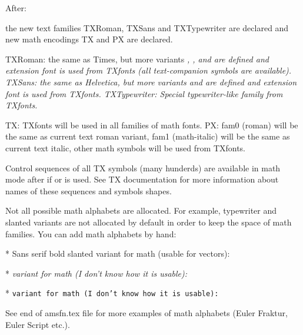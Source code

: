 After:



the new text families TXRoman, TXSans and TXTypewriter
are declared and new math encodings TX and PX are declared.

TXRoman: the same as Times, but more variants \sl, \bsl, \csc and 
         \bcsc are defined and extension font is used from TXfonts 
         (all text-companion symbols are available).
TXSans:  the same as Helvetica, but more variants \csc and \bcsc
         are defined and extension font is used from TXfonts.
TXTypewriter: Special typewriter-like family from TXfonts.

TX: TXfonts will be used in all families of math fonts.
PX: fam0 (roman) will be the same as current text roman variant,
    fam1 (math-italic) will be the same as current text italic,
    other math symbols will be used from TXfonts.

Control sequences of all TX symbols (many hunderds) are available 
in math mode after \setmath[//] if \def\fomenc{TX} or
\def\fomenc{PX} is used. See TX documentation for more information
about names of these sequences and symbols shapes.

Not all possible math alphabets are allocated. For example, typewriter
and slanted variants are not allocated by default in order to keep the
space of math families. You can add math alphabets by hand:

* Sans serif bold slanted variant for math (usable for vectors):

\addcmd\mathfonts {\newmathfam\vecfam \loadmathfam\vecfam [/txbsssl]}
\addcmd{}

* \sl variant for math (I don't know how it is usable):

\addcmd{}

* \tt variant for math (I don't know how it is usable):

\addcmd{}

See end of amsfn.tex file for more examples of math alphabets 
(Euler Fraktur, Euler Script etc.).






